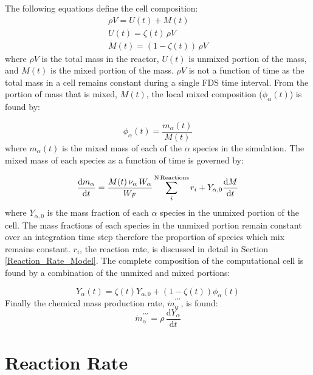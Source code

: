 The following equations define the cell composition:
\begin{eqnarray}\label{eq:mixunmix}
\rho V = U(t) + M(t) \\
U(t) = \zeta(t)\,\rho V \\
M(t) = (1-\zeta(t))\,\rho V
\end{eqnarray} 
where $\rho V$ is the total mass in the reactor, $U(t)$ is unmixed portion of the mass, and $M(t)$ is the mixed portion of the mass. $\rho V$ is not a function of time as the total mass in a cell remains constant during a single FDS time interval. From the portion of mass that is mixed, $M(t)$, the local mixed composition ($\phi_{\alpha}(t)$) is found by:

\begin{equation}\label{eq:phi}
\phi_{\alpha}(t)=\frac{m_{\alpha}(t)}{M(t)}
\end{equation}
where $m_\alpha(t)$ is the mixed mass of each of the $\alpha$ species in the simulation. The mixed mass of each species as a function of time is governed by:

\begin{equation}\label{eq:mixmass}
\frac{\mbox{d}m_{\alpha}}{\mbox{d}t}=\frac{M(t) \, \nu_{\alpha} \, W_{\alpha}}{W_F}\displaystyle \sum_{i}^{\text{N\,Reactions}}r_{i}+Y_{\alpha,0}\frac{\mbox{d}M}{\mbox{d}t} 
\end{equation}
where $Y_{\alpha,0}$ is the mass fraction of each $\alpha$ species in the unmixed portion of the cell. The mass fractions of each species in the unmixed portion remain constant over an integration time step therefore the proportion of species which mix remains constant. $r_{i}$, the reaction rate, is discussed in detail in Section \ref{Reaction_Rate_Model}. The complete composition of the computational cell is found by a combination of the unmixed and mixed portions:

\begin{equation}\label{eq:final_comp}
Y_{\alpha}(t)=\zeta(t)Y_{\alpha,0}+(1-\zeta(t))\phi_{\alpha}(t)
\end{equation}
Finally the chemical mass production rate, $\dot{m}^{\prime\prime\prime}_{\alpha}$, is found:
\begin{equation}\label{mass_prod_rate}
\dot{m}^{\prime\prime\prime}_{\alpha}=\rho \,\frac{\mbox{d}Y_{\alpha}}{\mbox{d}t}
\end{equation}

\section{Reaction Rate} 

